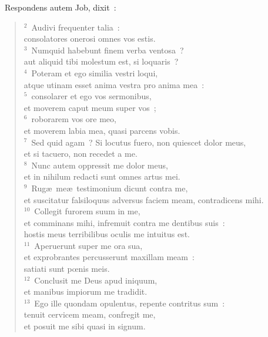 ~\lettrine[lines=10,image=true,loversize=0.05,lraise=-0.03]{R}{}espondens autem Job, dixit~:
\begin{flushleft}\begin{verse}\vspace{6pt}${}^{2}$~Audivi frequenter talia~:\\ consolatores onerosi omnes vos estis.\\
${}^{3}$~Numquid habebunt finem verba ventosa~?\\ aut aliquid tibi molestum est, si loquaris~?\\
${}^{4}$~Poteram et ego similia vestri loqui,\\ atque utinam esset anima vestra pro anima mea~:\\
${}^{5}$~consolarer et ego vos sermonibus,\\ et moverem caput meum super vos~;\\
${}^{6}$~roborarem vos ore meo,\\ et moverem labia mea, quasi parcens vobis.\\
${}^{7}$~Sed quid agam~? Si locutus fuero, non quiescet dolor meus,\\ et si tacuero, non recedet a me.\\
${}^{8}$~Nunc autem oppressit me dolor meus,\\ et in nihilum redacti sunt omnes artus mei.\\
${}^{9}$~Rug\ae\ me\ae\ testimonium dicunt contra me,\\ et suscitatur falsiloquus adversus faciem meam, contradicens mihi.\\
${}^{10}$~Collegit furorem suum in me,\\ et comminans mihi, infremuit contra me dentibus suis~:\\ hostis meus terribilibus oculis me intuitus est.\\
${}^{11}$~Aperuerunt super me ora sua,\\ et exprobrantes percusserunt maxillam meam~:\\ satiati sunt pœnis meis.\\
${}^{12}$~Conclusit me Deus apud iniquum,\\ et manibus impiorum me tradidit.\\
${}^{13}$~Ego ille quondam opulentus, repente contritus sum~:\\ tenuit cervicem meam, confregit me,\\ et posuit me sibi quasi in signum.\\

\end{verse}
\end{flushleft}
